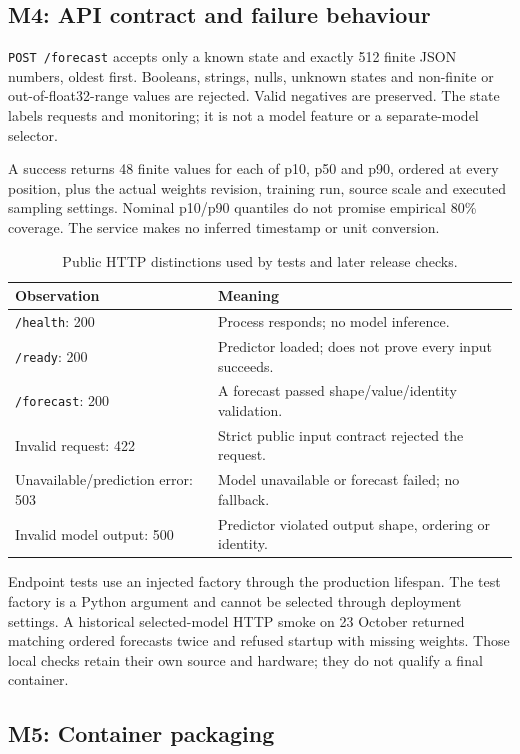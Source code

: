 \documentclass[a4paper,11pt]{article}
\begin{document}
\subsection{M4: API contract and failure behaviour}

\texttt{POST /forecast} accepts only a known state and exactly 512 finite JSON
numbers, oldest first. Booleans, strings, nulls, unknown states and non-finite or
out-of-float32-range values are rejected. Valid negatives are preserved. The state
labels requests and monitoring; it is not a model feature or a separate-model
selector.

A success returns 48 finite values for each of p10, p50 and p90, ordered at every
position, plus the actual weights revision, training run, source scale and executed
sampling settings. Nominal p10/p90 quantiles do not promise empirical 80\% coverage.
The service makes no inferred timestamp or unit conversion.

\begin{table}[ht]\centering
\caption{Public HTTP distinctions used by tests and later release checks.}
\begin{tabularx}{\linewidth}{lY}\toprule
Observation & Meaning \\\midrule
\texttt{/health}: 200 & Process responds; no model inference. \\
\texttt{/ready}: 200 & Predictor loaded; does not prove every input succeeds. \\
\texttt{/forecast}: 200 & A forecast passed shape/value/identity validation. \\
Invalid request: 422 & Strict public input contract rejected the request. \\
Unavailable/prediction error: 503 & Model unavailable or forecast failed; no fallback. \\
Invalid model output: 500 & Predictor violated output shape, ordering or identity. \\\bottomrule
\end{tabularx}\end{table}

Endpoint tests use an injected factory through the production lifespan. The test
factory is a Python argument and cannot be selected through deployment settings.
A historical selected-model HTTP smoke on 23 October returned matching ordered
forecasts twice and refused startup with missing weights. Those local checks
retain their own source and hardware; they do not qualify a final container.

\subsection{M5: Container packaging}
\end{document}
